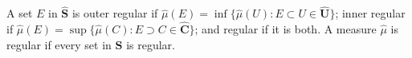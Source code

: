 A set $E$ in $\hat{\mathbf{S}}$ is outer regular if $\hat{\mu}(E) = \inf \{\hat{\mu}(U): E \subset U \in \hat{\mathbf{U}}\}$; inner regular if $\hat{\mu}(E) = \sup \{\hat{\mu}(C): E \supset C \in \hat{\mathbf{C}}\}$; and regular if it is both. A measure $\hat{\mu}$ is regular if every set in $\hat{\mathbf{S}}$ is regular.
